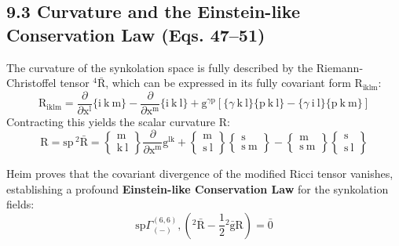 \documentclass[12pt]{article}
\begin{document}
\subsection{9.3 Curvature and the Einstein-like Conservation Law (Eqs. 47--51)}
\label{sec:field_curvature_conservation}

The curvature of the synkolation space is fully described by the Riemann-Christoffel tensor ${}^4\bar{\mathrm{R}}$, which can be expressed in its fully covariant form $\mathrm{R}_{\mathrm{iklm}}$:
\begin{equation}
\mathrm{R}_{\mathrm{iklm}} = \frac{\partial}{\partial \mathrm{x^l}}\{ \mathrm{i} \ \mathrm{k} \ \mathrm{m} \} - \frac{\partial}{\partial \mathrm{x^m}}\{ \mathrm{i} \ \mathrm{k} \ \mathrm{l} \} + \mathrm{g}^{\gamma\mathrm{p}} \left[ \{ \gamma \ \mathrm{k} \ \mathrm{l} \}\{ \mathrm{p} \ \mathrm{k} \ \mathrm{l} \} - \{ \gamma \ \mathrm{i} \ \mathrm{l} \}\{ \mathrm{p} \ \mathrm{k} \ \mathrm{m} \} \right] \tag{48a}
\end{equation}
Contracting this yields the scalar curvature $\mathrm{R}$:
\begin{equation}
\mathrm{R} = \mathrm{sp} \, {}^2\bar{\mathrm{R}} = \left\{ \begin{smallmatrix} \mathrm{m} \\ \mathrm{k} \ \mathrm{l} \end{smallmatrix} \right\}\frac{\partial}{\partial \mathrm{x^m}} \mathrm{g}^{\mathrm{lk}} + \left\{ \begin{smallmatrix} \mathrm{m} \\ \mathrm{s} \ \mathrm{l} \end{smallmatrix} \right\}\left\{ \begin{smallmatrix} \mathrm{s} \\ \mathrm{s} \ \mathrm{m} \end{smallmatrix} \right\} - \left\{ \begin{smallmatrix} \mathrm{m} \\ \mathrm{s} \ \mathrm{m} \end{smallmatrix} \right\}\left\{ \begin{smallmatrix} \mathrm{s} \\ \mathrm{s} \ \mathrm{l} \end{smallmatrix} \right\} \tag{48c}
\end{equation}

Heim proves that the covariant divergence of the modified Ricci tensor vanishes, establishing a profound \textbf{Einstein-like Conservation Law} for the synkolation fields:
\begin{equation}
\mathrm{sp} \Gamma^{(6,6)}_{(-)}, \left( {}^2\bar{\mathrm{R}} - \frac{1}{2}{}^2\bar{\mathrm{g}}\mathrm{R} \right) = \bar{0} \tag{49}
\label{eq:field_einstein_cons}
\end{equation}
\end{document}
